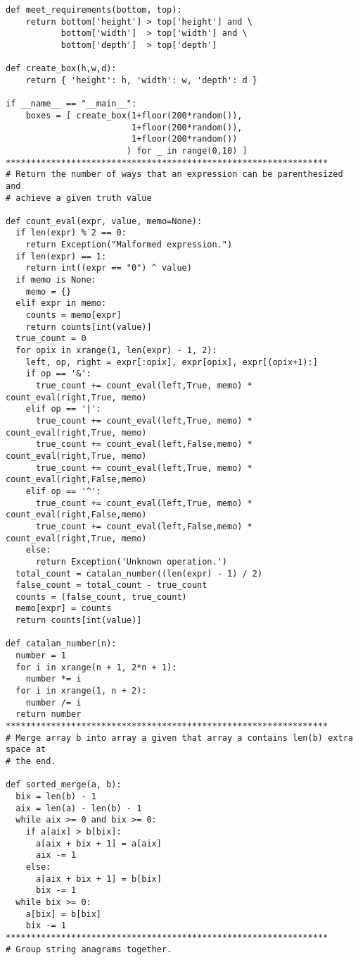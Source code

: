 \documentclass[12pt]{article}
\begin{document}
\begin{lstlisting}
def meet_requirements(bottom, top):
    return bottom['height'] > top['height'] and \
           bottom['width']  > top['width'] and \
           bottom['depth']  > top['depth']

def create_box(h,w,d):
    return { 'height': h, 'width': w, 'depth': d }

if __name__ == "__main__":
    boxes = [ create_box(1+floor(200*random()),
                         1+floor(200*random()),
                         1+floor(200*random())
                        ) for _ in range(0,10) ]
****************************************************************
# Return the number of ways that an expression can be parenthesized and
# achieve a given truth value

def count_eval(expr, value, memo=None):
  if len(expr) % 2 == 0:
    return Exception("Malformed expression.")
  if len(expr) == 1:
    return int((expr == "0") ^ value)
  if memo is None:
    memo = {}
  elif expr in memo:
    counts = memo[expr]
    return counts[int(value)]
  true_count = 0
  for opix in xrange(1, len(expr) - 1, 2):
    left, op, right = expr[:opix], expr[opix], expr[(opix+1):]
    if op == '&':
      true_count += count_eval(left,True, memo) * count_eval(right,True, memo)
    elif op == '|':
      true_count += count_eval(left,True, memo) * count_eval(right,True, memo)
      true_count += count_eval(left,False,memo) * count_eval(right,True, memo)
      true_count += count_eval(left,True, memo) * count_eval(right,False,memo)
    elif op == '^':
      true_count += count_eval(left,True, memo) * count_eval(right,False,memo)
      true_count += count_eval(left,False,memo) * count_eval(right,True, memo)
    else:
      return Exception('Unknown operation.')
  total_count = catalan_number((len(expr) - 1) / 2)
  false_count = total_count - true_count
  counts = (false_count, true_count)
  memo[expr] = counts
  return counts[int(value)]

def catalan_number(n):
  number = 1
  for i in xrange(n + 1, 2*n + 1):
    number *= i
  for i in xrange(1, n + 2):
    number /= i
  return number
****************************************************************
# Merge array b into array a given that array a contains len(b) extra space at
# the end.

def sorted_merge(a, b):
  bix = len(b) - 1
  aix = len(a) - len(b) - 1
  while aix >= 0 and bix >= 0:
    if a[aix] > b[bix]:
      a[aix + bix + 1] = a[aix]
      aix -= 1
    else:
      a[aix + bix + 1] = b[bix]
      bix -= 1
  while bix >= 0:
    a[bix] = b[bix]
    bix -= 1
****************************************************************
# Group string anagrams together.


\end{lstlisting}
\end{document}
